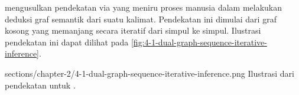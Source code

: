\textcite{cai2020} mengusulkan pendekatan \amrparsing{} via  yang meniru proses manusia dalam melakukan deduksi graf semantik dari suatu kalimat.
Pendekatan ini dimulai dari graf kosong yang memanjang secara iteratif dari simpul ke simpul.
Ilustrasi pendekatan ini dapat dilihat pada \cref{fig:4-1-dual-graph-sequence-iterative-inference}.


  {sections/chapter-2/4-1-dual-graph-sequence-iterative-inference.png}
  {Ilustrasi dari pendekatan  untuk \amrparsing{} .}
